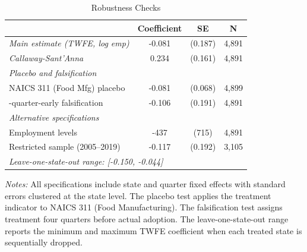 \begin{table}[t]
\centering
\caption{Robustness Checks}
\label{tab:robust}
\begin{threeparttable}
\begin{tabular}{lccc}
\toprule
 & Coefficient & SE & N \\
\midrule
\textit{Main estimate (TWFE, log emp)} & -0.081 & (0.187) & 4,891 \\
\textit{Callaway-Sant'Anna} & 0.234 & (0.161) & 4,891 \\[4pt]
\multicolumn{4}{l}{\textit{Placebo and falsification}} \\
\quad NAICS 311 (Food Mfg) placebo & -0.081 & (0.068) & 4,899 \\
\quad 4-quarter-early falsification & -0.106 & (0.191) & 4,891 \\[4pt]
\multicolumn{4}{l}{\textit{Alternative specifications}} \\
\quad Employment levels & -437 & (715) & 4,891 \\
\quad Restricted sample (2005--2019) & -0.117 & (0.192) & 3,105 \\[4pt]
\multicolumn{4}{l}{\textit{Leave-one-state-out range: [-0.150, -0.044]}} \\
\bottomrule
\end{tabular}
\begin{tablenotes}[flushleft]\small
\item \textit{Notes:} All specifications include state and quarter fixed effects with
standard errors clustered at the state level. The placebo test applies the treatment
indicator to NAICS 311 (Food Manufacturing). The falsification test assigns treatment
four quarters before actual adoption. The leave-one-state-out range reports the minimum
and maximum TWFE coefficient when each treated state is sequentially dropped.
\end{tablenotes}
\end{threeparttable}
\end{table}
